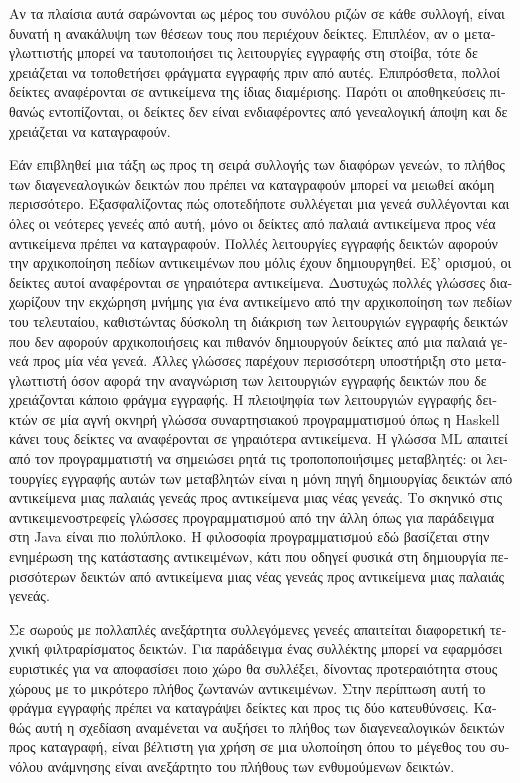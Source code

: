 \begin{greek}
Αν τα πλαίσια αυτά σαρώνονται ως μέρος του συνόλου ριζών σε
κάθε συλλογή, είναι δυνατή η ανακάλυψη των θέσεων τους που
περιέχουν δείκτες. Επιπλέον, αν ο μεταγλωττιστής μπορεί να
ταυτοποιήσει τις λειτουργίες εγγραφής στη στοίβα, τότε δε
χρειάζεται να τοποθετήσει φράγματα εγγραφής πριν από αυτές.
Επιπρόσθετα, πολλοί δείκτες αναφέρονται σε αντικείμενα της
ίδιας διαμέρισης. Παρότι οι αποθηκεύσεις πιθανώς εντοπίζονται,
οι δείκτες δεν είναι ενδιαφέροντες από γενεαλογική άποψη και
δε χρειάζεται να καταγραφούν.

Εάν επιβληθεί μια τάξη ως προς τη σειρά συλλογής των διαφόρων
γενεών, το πλήθος των διαγενεαλογικών δεικτών που πρέπει να
καταγραφούν μπορεί να μειωθεί ακόμη περισσότερο. Εξασφαλίζοντας
πώς οποτεδήποτε συλλέγεται μια γενεά συλλέγονται και όλες οι
νεότερες γενεές από αυτή, μόνο οι δείκτες από παλαιά αντικείμενα
προς νέα αντικείμενα πρέπει να καταγραφούν. Πολλές λειτουργίες
εγγραφής δεικτών αφορούν την αρχικοποίηση πεδίων αντικειμένων
που μόλις έχουν δημιουργηθεί. Εξ' ορισμού, οι δείκτες αυτοί
αναφέρονται σε γηραιότερα αντικείμενα. Δυστυχώς πολλές γλώσσες
διαχωρίζουν την εκχώρηση μνήμης για ένα αντικείμενο από την
αρχικοποίηση των πεδίων του τελευταίου, καθιστώντας δύσκολη τη
διάκριση των λειτουργιών εγγραφής δεικτών που δεν αφορούν
αρχικοποιήσεις και πιθανόν δημιουργούν δείκτες από μια παλαιά
γενεά προς μία νέα γενεά. Άλλες γλώσσες παρέχουν περισσότερη
υποστήριξη στο μεταγλωττιστή όσον αφορά την αναγνώριση των
λειτουργιών εγγραφής δεικτών που δε χρειάζονται κάποιο φράγμα
εγγραφής. Η πλειοψηφία των λειτουργιών εγγραφής δεικτών σε μία
αγνή οκνηρή γλώσσα συναρτησιακού προγραμματισμού όπως η Haskell
κάνει τους δείκτες να αναφέρονται σε γηραιότερα αντικείμενα.
Η γλώσσα ML απαιτεί από τον προγραμματιστή να σημειώσει ρητά
τις τροποποποιήσιμες μεταβλητές: οι λειτουργίες εγγραφής αυτών
των μεταβλητών είναι η μόνη πηγή δημιουργίας δεικτών από
αντικείμενα μιας παλαιάς γενεάς προς αντικείμενα μιας νέας
γενεάς. Το σκηνικό στις αντικειμενοστρεφείς γλώσσες προγραμματισμού
από την άλλη όπως για παράδειγμα στη Java είναι πιο πολύπλοκο.
Η φιλοσοφία προγραμματισμού εδώ βασίζεται στην ενημέρωση της
κατάστασης αντικειμένων, κάτι που οδηγεί φυσικά στη δημιουργία
περισσότερων δεικτών από αντικείμενα μιας νέας γενεάς προς
αντικείμενα μιας παλαιάς γενεάς.

Σε σωρούς με πολλαπλές ανεξάρτητα συλλεγόμενες γενεές απαιτείται
διαφορετική τεχνική φιλτραρίσματος δεικτών. Για παράδειγμα ένας
συλλέκτης μπορεί να εφαρμόσει ευριστικές για να αποφασίσει
ποιο χώρο θα συλλέξει, δίνοντας προτεραιότητα στους χώρους
με το μικρότερο πλήθος ζωντανών αντικειμένων. Στην περίπτωση
αυτή το φράγμα εγγραφής πρέπει να καταγράψει δείκτες και προς
τις δύο κατευθύνσεις. Καθώς αυτή η σχεδίαση αναμένεται να αυξήσει
το πλήθος των διαγενεαλογικών δεικτών προς καταγραφή, είναι
βέλτιστη για χρήση σε μια υλοποίηση όπου το μέγεθος του συνόλου
ανάμνησης είναι ανεξάρτητο του πλήθους των ενθυμούμενων
δεικτών.


\end{greek}
